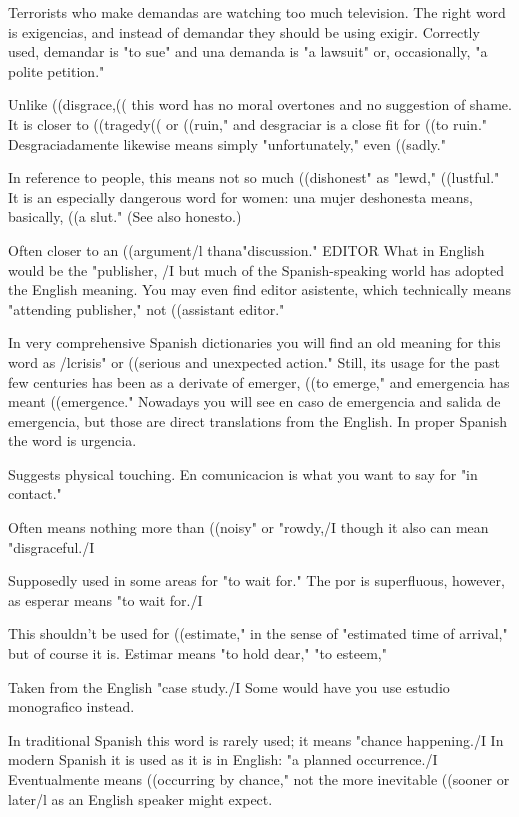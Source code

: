 Terrorists who make demandas are watching
too much television. The right word is exigencias, and instead of
demandar they should be using exigir. Correctly used, demandar is
"to sue" and una demanda is "a lawsuit" or, occasionally, "a polite
petition."

 Unlike ((disgrace,(( this word has no moral overtones and no suggestion of shame. It is closer to ((tragedy(( or ((ruin,"
and desgraciar is a close fit for ((to ruin." Desgraciadamente likewise
means simply "unfortunately," even ((sadly."

 In reference to people, this means not so
much ((dishonest" as "lewd," ((lustful." It is an especially dangerous
word for women: una mujer deshonesta means, basically, ((a slut."
(See also honesto.)

 Often closer to an ((argument/l thana"discussion."
EDITOR What in English would be the "publisher, /I but much
of the Spanish-speaking world has adopted the English meaning. You
may even find editor asistente, which technically means "attending
publisher," not ((assistant editor."

 In very comprehensive Spanish dictionaries
you will find an old meaning for this word as /lcrisis" or ((serious and
unexpected action." Still, its usage for the past few centuries has been
as a derivate of emerger, ((to emerge," and emergencia has meant
((emergence." Nowadays you will see en caso de emergencia and salida de emergencia, but those are direct translations from the English.
In proper Spanish the word is urgencia.

 Suggests physical touching. En comunicacion
is what you want to say for "in contact."

 Often means nothing more than ((noisy" or
"rowdy,/I though it also can mean "disgraceful./I

 Supposedly used in some areas for "to wait
for." The por is superfluous, however, as esperar means "to wait for./I

 This shouldn't be used for ((estimate," in the sense
of "estimated time of arrival," but of course it is. Estimar means "to
hold dear," "to esteem,"

 Taken from the English "case study./I
Some would have you use estudio monografico instead.

 In traditional Spanish this word is rarely used; it
means "chance happening./I In modern Spanish it is used as it is in
English: "a planned occurrence./I Eventualmente means ((occurring
by chance," not the more inevitable ((sooner or later/l as an English
speaker might expect.

